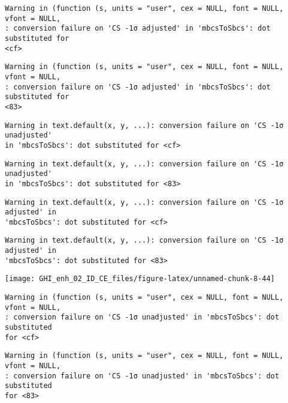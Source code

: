 \documentclass[
  10pt,
  a4paper,oneside]{article}
\begin{document}
\begin{verbatim}
Warning in (function (s, units = "user", cex = NULL, font = NULL, vfont = NULL,
: conversion failure on 'CS -1σ adjusted' in 'mbcsToSbcs': dot substituted for
<cf>
\end{verbatim}

\begin{verbatim}
Warning in (function (s, units = "user", cex = NULL, font = NULL, vfont = NULL,
: conversion failure on 'CS -1σ adjusted' in 'mbcsToSbcs': dot substituted for
<83>
\end{verbatim}

\begin{verbatim}
Warning in text.default(x, y, ...): conversion failure on 'CS -1σ unadjusted'
in 'mbcsToSbcs': dot substituted for <cf>
\end{verbatim}

\begin{verbatim}
Warning in text.default(x, y, ...): conversion failure on 'CS -1σ unadjusted'
in 'mbcsToSbcs': dot substituted for <83>
\end{verbatim}

\begin{verbatim}
Warning in text.default(x, y, ...): conversion failure on 'CS -1σ adjusted' in
'mbcsToSbcs': dot substituted for <cf>
\end{verbatim}

\begin{verbatim}
Warning in text.default(x, y, ...): conversion failure on 'CS -1σ adjusted' in
'mbcsToSbcs': dot substituted for <83>
\end{verbatim}

\begin{center}\texttt{[image: GHI\_enh\_02\_ID\_CE\_files/figure-latex/unnamed-chunk-8-44]} \end{center}

\begin{verbatim}
Warning in (function (s, units = "user", cex = NULL, font = NULL, vfont = NULL,
: conversion failure on 'CS -1σ unadjusted' in 'mbcsToSbcs': dot substituted
for <cf>
\end{verbatim}

\begin{verbatim}
Warning in (function (s, units = "user", cex = NULL, font = NULL, vfont = NULL,
: conversion failure on 'CS -1σ unadjusted' in 'mbcsToSbcs': dot substituted
for <83>
\end{verbatim}
\end{document}
